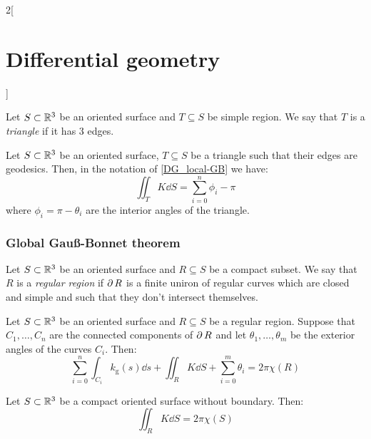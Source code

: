 \documentclass[../../../main_math.tex]{subfiles}
\begin{document}
\begin{multicols}{2}[\section{Differential geometry}]
\begin{theorem}
  \end{theorem}
  \begin{definition}
    Let $S\subset\mathbb{R}^3$ be an oriented surface and $T\subseteq S$ be simple region. We say that $T$ is a \emph{triangle} if it has 3 edges.
  \end{definition}
  \begin{corollary}
    Let $S\subset\mathbb{R}^3$ be an oriented surface, $T\subseteq S$ be a triangle such that their edges are geodesics. Then, in the notation of \cref{DG_local-GB} we have: $$\iint_{T}K\dd{S}=\sum_{i=0}^n\phi_i-\pi$$
    where $\phi_i=\pi-\theta_i$ are the interior angles of the triangle.
  \end{corollary}
  \subsubsection{Global Gau\ss-Bonnet theorem}
  \begin{definition}
    Let $S\subset\mathbb{R}^3$ be an oriented surface and $R\subseteq S$ be a compact subset. We say that $R$ is a \emph{regular region} if $\operatorname{\partial}{R}$ is a finite uniron of regular curves which are closed and simple and such that they don't intersect themselves.
  \end{definition}
  \begin{theorem}
    Let $S\subset\mathbb{R}^3$ be an oriented surface and $R\subseteq S$ be a regular region. Suppose that $C_1,\ldots,C_n$ are the connected components of $\operatorname{\partial}{R}$ and let $\theta_1,\ldots,\theta_m$ be the exterior angles of the curves $C_i$. Then: $$\sum_{i=0}^n\int_{C_i}k_{\text{g}}(s)\dd{s}+\iint_{R}K\dd{S}+\sum_{i=0}^m\theta_i=2\pi\chi(R)$$
  \end{theorem}
  \begin{corollary}
    Let $S\subset\mathbb{R}^3$ be a compact oriented surface without boundary. Then: $$\iint_{R}K\dd{S}=2\pi\chi(S)$$
  \end{corollary}

\end{multicols}
\end{document}
